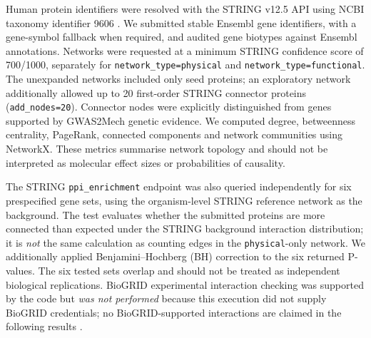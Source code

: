 \documentclass[11pt,a4paper]{article}
\begin{document}
Human protein identifiers were resolved with the STRING v12.5 API using NCBI taxonomy identifier 9606 \citep{Szklarczyk2025STRING}. We submitted stable Ensembl gene identifiers, with a gene-symbol fallback when required, and audited gene biotypes against Ensembl annotations. Networks were requested at a minimum STRING confidence score of 700/1000, separately for \texttt{network\_type=physical} and \texttt{network\_type=functional}. The unexpanded networks included only seed proteins; an exploratory network additionally allowed up to 20 first-order STRING connector proteins (\texttt{add\_nodes=20}). Connector nodes were explicitly distinguished from genes supported by GWAS2Mech genetic evidence. We computed degree, betweenness centrality, PageRank, connected components and network communities using NetworkX. These metrics summarise network topology and should not be interpreted as molecular effect sizes or probabilities of causality.

The STRING \texttt{ppi\_enrichment} endpoint was also queried independently for six prespecified gene sets, using the organism-level STRING reference network as the background. The test evaluates whether the submitted proteins are more connected than expected under the STRING background interaction distribution; it is \emph{not} the same calculation as counting edges in the \texttt{physical}-only network. We additionally applied Benjamini--Hochberg (BH) correction to the six returned P-values. The six tested sets overlap and should not be treated as independent biological replications. BioGRID experimental interaction checking was supported by the code but \emph{was not performed} because this execution did not supply BioGRID credentials; no BioGRID-supported interactions are claimed in the following results \citep{Oughtred2021BioGRID}.
\end{document}
